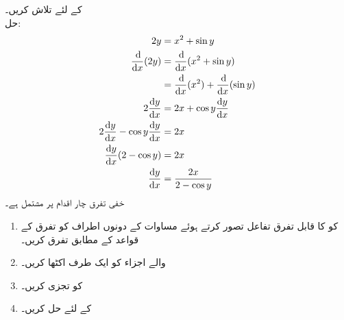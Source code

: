  کے لئے  تلاش کریں۔\\
حل:\quad
\begin{align*}
2y&=x^2+\sin y\\
\frac{\dif}{\dif x}(2y)&=\frac{\dif}{\dif x}(x^2+\sin y)\\
&=\frac{\dif}{\dif x}(x^2)+\frac{\dif}{\dif x}(\sin y)\\
2\frac{\dif y}{\dif x}&=2x+\cos y\frac{\dif y}{\dif x}\\
2\frac{\dif y}{\dif x}-\cos y \frac{\dif y}{\dif x}&=2x\\
\frac{\dif y}{\dif x}(2-\cos y)&=2x\\
\frac{\dif y}{\dif x}&=\frac{2x}{2-\cos y}
\end{align*}
خفی تفرق چار اقدام پر مشتمل ہے۔
\begin{enumerate}[1.]

\item
{} کو  کا قابل تفرق تفاعل تصور کرتے ہوئے مساوات کے دونوں اطراف کو تفرق کے قواعد کے مطابق تفرق کریں۔
\item
{} والے اجزاء کو ایک طرف اکٹھا کریں۔\\
\item
{} کو تجزی کریں۔\\
\item
{} کے لئے حل کریں۔
\end{enumerate}

